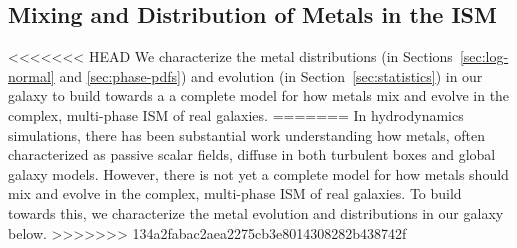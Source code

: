 \documentclass[twocolumn]{aastex61}
\begin{document}
\subsection{Mixing and Distribution of Metals in the ISM}
\label{sec:mixing}

<<<<<<< HEAD
      We characterize the metal distributions (in Sections~\ref{sec:log-normal} and \ref{sec:phase-pdfs}) and evolution (in Section~\ref{sec:statistics}) in our galaxy to build towards a  a complete model for how metals mix and evolve in the complex, multi-phase ISM of real galaxies.
=======
In hydrodynamics simulations, there has been substantial work understanding how metals, often characterized as passive scalar fields, diffuse in both turbulent boxes and global galaxy models. However, there is not  yet a complete model for how metals should mix and evolve in the complex, multi-phase ISM of real galaxies. To build towards this, we characterize the metal evolution and distributions in our galaxy below.
>>>>>>> 134a2fabac2aea2275cb3e8014308282b438742f
\end{document}
